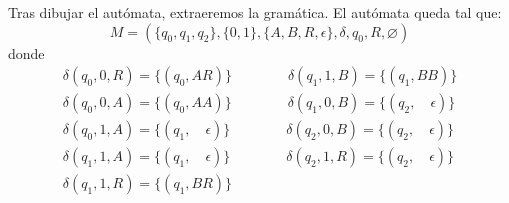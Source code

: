 \documentclass[11pt,a4paper]{article}
\begin{document}
Tras dibujar el autómata, extraeremos la gramática. El autómata queda tal que:
\[M=(\{q_0,q_1,q_2\},\{0,1\},\{A,B,R,\epsilon\},\delta,q_0,R,\varnothing)\]
donde
	\[\begin{array}{c}
		\delta(q_0,0,R)=\{(q_0,AR)\} \qquad \qquad \delta(q_1,1,B)=\{(q_1,BB)\}\\
		\delta(q_0,0,A)=\{(q_0,AA)\} \qquad \qquad \delta(q_1,0,B)=\{(q_2, \quad \epsilon)\}\\
		\delta(q_0,1,A)=\{(q_1, \quad \epsilon)\} \qquad \qquad \delta(q_2,0,B)=\{(q_2, \quad \epsilon)\}\\
		\delta(q_1,1,A)=\{(q_1, \quad \epsilon)\} \qquad \qquad \delta(q_2,1,R)=\{(q_2, \quad \epsilon)\}\\
		\delta(q_1,1,R)=\{(q_1,BR)\} \qquad \qquad \qquad \qquad \qquad \qquad \qquad \qquad
	\end{array}\]
	
\end{document}
